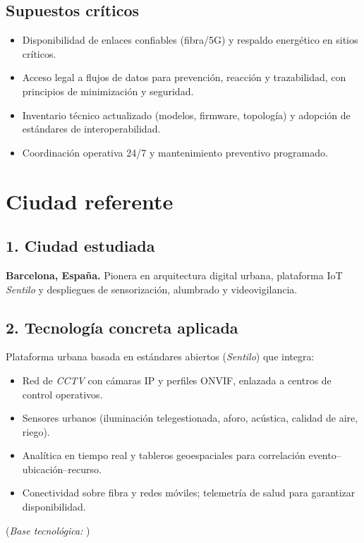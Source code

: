 \documentclass[12pt,a4paper]{article}
\begin{document}
\subsection*{Supuestos críticos}
\begin{itemize}
    \item Disponibilidad de enlaces confiables (fibra/5G) y respaldo energético en sitios críticos.
    \item Acceso legal a flujos de datos para prevención, reacción y trazabilidad, con principios de minimización y seguridad.
    \item Inventario técnico actualizado (modelos, firmware, topología) y adopción de estándares de interoperabilidad.
    \item Coordinación operativa 24/7 y mantenimiento preventivo programado.
\end{itemize}

\section{Ciudad referente}
\subsection*{1. Ciudad estudiada}
\textbf{Barcelona, España.} Pionera en arquitectura digital urbana, plataforma IoT \textit{Sentilo} y despliegues de sensorización, alumbrado y videovigilancia.

\subsection*{2. Tecnología concreta aplicada}
Plataforma urbana basada en estándares abiertos (\textit{Sentilo}) que integra:
\begin{itemize}
  \item Red de \textit{CCTV} con cámaras IP y perfiles ONVIF, enlazada a centros de control operativos.
  \item Sensores urbanos (iluminación telegestionada, aforo, acústica, calidad de aire, riego).
  \item Analítica en tiempo real y tableros geoespaciales para correlación evento--ubicación--recurso.
  \item Conectividad sobre fibra y redes móviles; telemetría de salud para garantizar disponibilidad.
\end{itemize}
\noindent(\textit{Base tecnológica:} \cite{sentiloCaseStudy,ciscoBarcelona})
\end{document}
